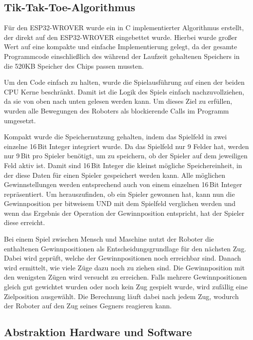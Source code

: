 \documentclass[conference,compsoc,final,a4paper]{IEEEtran}
\begin{document}
\subsection{Tik-Tak-Toe-Algorithmus}

Für den ESP32-WROVER wurde ein in C implementierter Algorithmus erstellt, der direkt auf
den ESP32-WROVER eingebettet wurde. Hierbei wurde großer Wert auf eine kompakte und einfache
Implementierung gelegt, da der gesamte Programmcode einschließlich des während der Laufzeit
gehaltenen Speichers in die 520KB Speicher des Chips passen mussten.

Um den Code einfach zu halten, wurde die Spielausführung auf einen der beiden CPU Kerne beschränkt.
Damit ist die Logik des Spiels einfach nachzuvollziehen, da sie von oben nach unten gelesen werden kann.
Um dieses Ziel zu erfüllen, wurden alle Bewegungen des Roboters als blockierende Calls im Programm
umgesetzt.

Kompakt wurde die Speichernutzung gehalten, indem das Spielfeld in zwei einzelne 16\,Bit Integer integriert wurde.
Da das Spielfeld nur 9 Felder hat, werden nur 9\,Bit pro Spieler benötigt, um zu speichern, ob der Spieler
auf dem jeweiligen Feld aktiv ist. Damit sind 16\,Bit Integer die kleinst mögliche Speichereinheit, in der
diese Daten für einen Spieler gespeichert werden kann. Alle möglichen Gewinnstellungen werden entsprechend
auch von einem einzelnen 16\,Bit Integer repräsentiert. Um herauszufinden, ob ein Spieler gewonnen hat, kann
nun die Gewinnposition per bitweisem UND mit dem Spielfeld verglichen werden und wenn das Ergebnis der
Operation der Gewinnposition entspricht, hat der Spieler diese erreicht.

Bei einem Spiel zwischen Mensch und Maschine nutzt der Roboter die enthaltenen Gewinnpositionen als
Entscheidungsgrundlage für den nächsten Zug. Dabei wird geprüft, welche der Gewinnpositionen noch erreichbar
sind. Danach wird ermittelt, wie viele Züge dazu noch zu ziehen sind. Die Gewinnposition mit den
wenigsten Zügen wird versucht zu erreichen. Falls mehrere Gewinnpositionen gleich gut gewichtet wurden
oder noch kein Zug gespielt wurde, wird zufällig eine Zielposition ausgewählt. Die Berechnung läuft
dabei nach jedem Zug, wodurch der Roboter auf den Zug seines Gegners reagieren kann.

\subsection{Abstraktion Hardware und Software}
\end{document}
